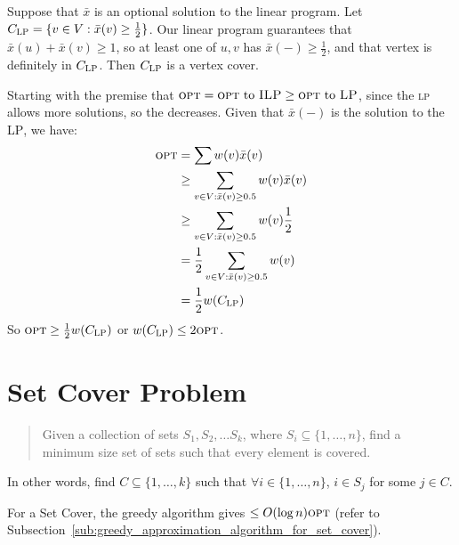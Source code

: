                     Suppose that $\bar{x}$ is an optional solution to the linear program.
                    Let $C_{\textsc{LP}} = \{ v \in V : \bar{x}(v) \ge \frac{1}{2} \}$.
                    Our linear program guarantees that $\bar{x}(u) + \bar{x}(v) \ge 1$, so at least one of $u, v$ has $\bar{x}(-) \ge \frac{1}{2}$, and that vertex is definitely in $C_{\textsc{LP}}$.
                    Then $C_{\textsc{LP}}$ is a vertex cover.

                    Starting with the premise that $\textsc{opt} = \textsc{opt} \text{ to } \textsc{ILP} \ge \textsc{opt} \text{ to } \textsc{LP}$, since the \textsc{lp} allows more solutions, so the \opt decreases.
                    Given that $\bar{x}(-)$ is the \opt solution to the \textsc{LP}, we have:
                    \begin{align*}
                        \textsc{opt} &= \sum w(v) \bar{x}(v) \\
                        &\ge \sum_{v \in V : \bar{x}(v) \ge 0.5} w(v) \bar{x}(v) \\
                        &\ge \sum_{v \in V : \bar{x}(v) \ge 0.5} w(v) \frac{1}{2} \\
                        &= \frac{1}{2} \sum_{v \in V : \bar{x}(v) \ge 0.5} w(v) \\
                        &= \frac{1}{2} w(C_{\textsc{LP}})
                    \end{align*}
                    So $\textsc{opt} \ge \frac{1}{2} w(C_{\textsc{LP}})$ or $w(C_{\textsc{LP}}) \le 2 \textsc{opt}$.

            \section{Set Cover Problem} %
            \label{sec:set_cover_problem}
                \begin{quotation}
                    Given a collection of sets $S_1, S_2, \ldots S_k$, where $S_i \subseteq \{1, \ldots, n \}$, find a minimum size set of sets such that every element is covered.
                \end{quotation}
                In other words, find $C \subseteq \{ 1, \ldots, k\}$ such that $\forall i \in \{1, \ldots, n\}$, $i \in S_j$ for some $j \in C$.

                For a Set Cover, the greedy algorithm gives $\le O(\log n) \textsc{opt}$ (refer to Subsection~\ref{sub:greedy_approximation_algorithm_for_set_cover}).

